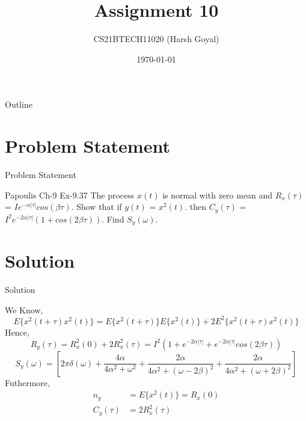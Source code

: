 \documentclass{beamer}
\title{Assignment 10}
\author{CS21BTECH11020 (Harsh Goyal)}
\date{\today}
\begin{document}
\begin{frame}
    \titlepage 
\end{frame}

\logo{}


\begin{frame}{Outline}
    \tableofcontents
\end{frame}


\section{Problem Statement}
\begin{frame}{Problem Statement}
\begin{block}{Papoulis Ch-9 Ex-9.37 }
The process $x(t)$ is normal with zero mean and $R_x(\tau)$ = $Ie^{-\alpha |\tau|}cos(\beta \tau)$. Show that if $y(t)$ =
$x^2(t)$. then $C_y(\tau)$ = $I^2e^{-2 \alpha |\tau|}(1 + cos(2\beta\tau))$. Find $S_y(\omega)$.
    
\end{block}

\end{frame}


\section{Solution}
\begin{frame}{Solution}
 \begin{block}{}
 We Know,
 \begin{equation}
     E\{x^2(t+\tau)x^2(t)\} = E\{x^2(t+\tau)\}E\{x^2(t)\} + 2E^2\{x^2(t+\tau)x^2(t)\}
 \end{equation}
 Hence,
 \begin{equation}
     R_y(\tau) = R_x^2(0)+2R_x^2(\tau) = I^2(1+e^{-2\alpha |\tau|}+e^{-2\alpha |\tau|}cos(2\beta \tau))
 \end{equation}
 \begin{equation}
     S_y(\omega) = \left[ 2\pi\delta(\omega) + \frac{4\alpha}{4\alpha^2+\omega^2}+\frac{2\alpha}{4\alpha^2+(\omega-2\beta)^2}+ \frac{2\alpha}{4\alpha^2+(\omega+2\beta)^2} \right]
 \end{equation}
 Futhermore,
 \begin{align}
	 n_y&= E\{x^2(t)\} = R_x(0) \\
	 C_y(\tau)&= 2R_x^2(\tau)
 \end{align}
 \end{block}
\end{frame} 
\end{document}
